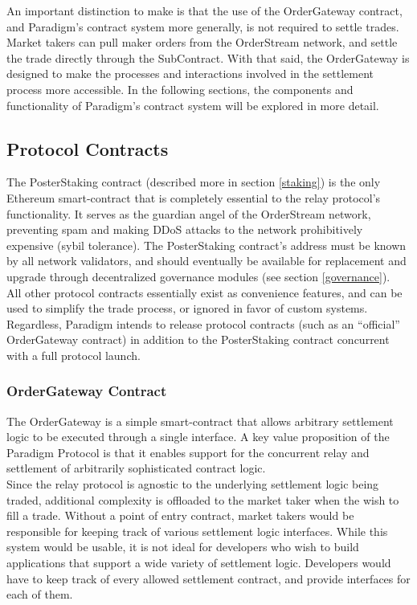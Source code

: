 \documentclass[9pt]{article}
\begin{document}
\noindent An important distinction to make is that the use of the OrderGateway contract, and Paradigm’s contract system more generally, is not required to settle trades. Market takers can pull maker orders from the OrderStream network, and settle the trade directly through the SubContract. With that said, the OrderGateway is designed to make the processes and interactions involved in the settlement process more accessible. In the following sections, the components and functionality of Paradigm’s contract system will be explored in more detail.

\subsection{Protocol Contracts}
\noindent The PosterStaking contract (described more in section \ref{staking}) is the only Ethereum smart-contract that is completely essential to the relay protocol’s functionality. It serves as the guardian angel of the OrderStream network, preventing spam and making DDoS attacks to the network prohibitively expensive (sybil tolerance). The PosterStaking contract’s address must be known by all network validators, and should eventually be available for replacement and upgrade through decentralized governance modules (see section \ref{governance}). \\

\noindent All other protocol contracts essentially exist as convenience features, and can be used to simplify the trade process, or ignored in favor of custom systems. Regardless, Paradigm intends to release protocol contracts (such as an “official” OrderGateway contract) in addition to the PosterStaking contract concurrent with a full protocol launch.

\subsubsection{OrderGateway Contract}\label{ordergateway}
\noindent The OrderGateway is a simple smart-contract that allows arbitrary settlement logic to be executed through a single interface. A key value proposition of the Paradigm Protocol is that it enables support for the concurrent relay and settlement of arbitrarily sophisticated contract logic. \\

\noindent Since the relay protocol is agnostic to the underlying settlement logic being traded, additional complexity is offloaded to the market taker when the wish to fill a trade. Without a point of entry contract, market takers would be responsible for keeping track of various settlement logic interfaces. While this system would be usable, it is not ideal for developers who wish to build applications that support a wide variety of settlement logic. Developers would have to keep track of every allowed settlement contract, and provide interfaces for each of them. \\
\end{document}

